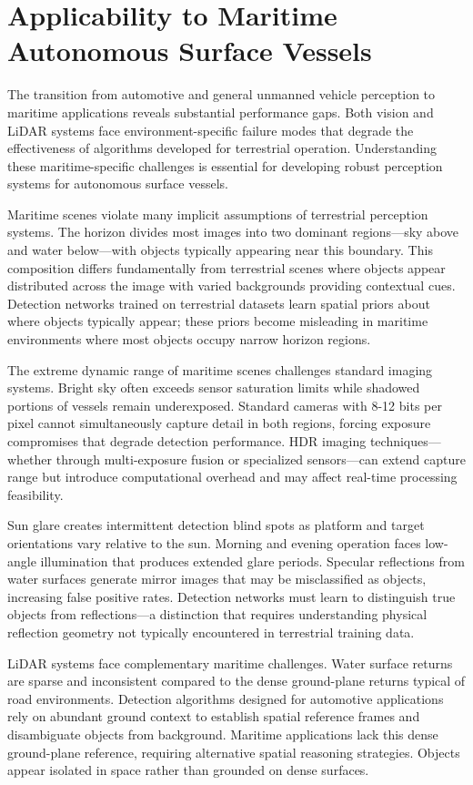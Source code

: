 \documentclass[../main.tex]{subfiles}
\begin{document}
\section{Applicability to Maritime Autonomous Surface Vessels}

The transition from automotive and general unmanned vehicle perception to maritime applications reveals substantial performance gaps. Both vision and LiDAR systems face environment-specific failure modes that degrade the effectiveness of algorithms developed for terrestrial operation. Understanding these maritime-specific challenges is essential for developing robust perception systems for autonomous surface vessels.

Maritime scenes violate many implicit assumptions of terrestrial perception systems. The horizon divides most images into two dominant regions—sky above and water below—with objects typically appearing near this boundary. This composition differs fundamentally from terrestrial scenes where objects appear distributed across the image with varied backgrounds providing contextual cues. Detection networks trained on terrestrial datasets learn spatial priors about where objects typically appear; these priors become misleading in maritime environments where most objects occupy narrow horizon regions.

The extreme dynamic range of maritime scenes challenges standard imaging systems. Bright sky often exceeds sensor saturation limits while shadowed portions of vessels remain underexposed. Standard cameras with 8-12 bits per pixel cannot simultaneously capture detail in both regions, forcing exposure compromises that degrade detection performance. HDR imaging techniques—whether through multi-exposure fusion or specialized sensors—can extend capture range but introduce computational overhead and may affect real-time processing feasibility.

Sun glare creates intermittent detection blind spots as platform and target orientations vary relative to the sun. Morning and evening operation faces low-angle illumination that produces extended glare periods. Specular reflections from water surfaces generate mirror images that may be misclassified as objects, increasing false positive rates. Detection networks must learn to distinguish true objects from reflections—a distinction that requires understanding physical reflection geometry not typically encountered in terrestrial training data.

LiDAR systems face complementary maritime challenges. Water surface returns are sparse and inconsistent compared to the dense ground-plane returns typical of road environments. Detection algorithms designed for automotive applications rely on abundant ground context to establish spatial reference frames and disambiguate objects from background. Maritime applications lack this dense ground-plane reference, requiring alternative spatial reasoning strategies. Objects appear isolated in space rather than grounded on dense surfaces.
\end{document}
